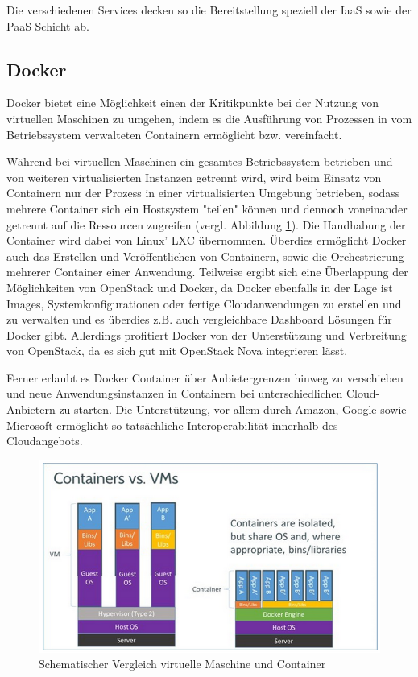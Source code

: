 Die verschiedenen Services decken so die Bereitstellung speziell der IaaS sowie der PaaS Schicht ab.

\subsection{Docker}
Docker bietet eine Möglichkeit einen der Kritikpunkte bei der Nutzung von virtuellen Maschinen zu umgehen, indem es die Ausführung von Prozessen in vom Betriebssystem verwalteten Containern ermöglicht bzw. vereinfacht.

Während bei virtuellen Maschinen ein gesamtes Betriebssystem betrieben und von weiteren virtualisierten Instanzen getrennt wird, wird beim Einsatz von Containern nur der Prozess in einer virtualisierten Umgebung betrieben, sodass mehrere Container sich ein Hostsystem "teilen" können und dennoch voneinander getrennt auf die Ressourcen zugreifen (vergl. Abbildung \ref{fig:docker}). Die Handhabung der Container wird dabei von Linux' LXC übernommen. Überdies ermöglicht Docker auch das Erstellen und Veröffentlichen von Containern, sowie die Orchestrierung mehrerer Container einer Anwendung. Teilweise ergibt sich eine Überlappung der Möglichkeiten von OpenStack und Docker, da Docker ebenfalls in der Lage ist Images, Systemkonfigurationen oder fertige Cloudanwendungen zu erstellen und zu verwalten und es überdies z.B. auch vergleichbare Dashboard Lösungen für Docker gibt. Allerdings profitiert Docker von der Unterstützung und Verbreitung von OpenStack, da es sich gut mit OpenStack Nova integrieren lässt.

Ferner erlaubt es Docker Container über Anbietergrenzen hinweg zu verschieben und neue Anwendungsinstanzen in Containern bei unterschiedlichen Cloud-Anbietern zu starten. Die Unterstützung, vor allem durch Amazon, Google sowie Microsoft ermöglicht so tatsächliche Interoperabilität innerhalb des Cloudangebots.

\begin{figure}
	\centering
	\includegraphics[width=0.8\linewidth]{images/docker-vm-container}
	\caption{Schematischer Vergleich virtuelle Maschine und Container}
	\label{fig:docker}
\end{figure}

